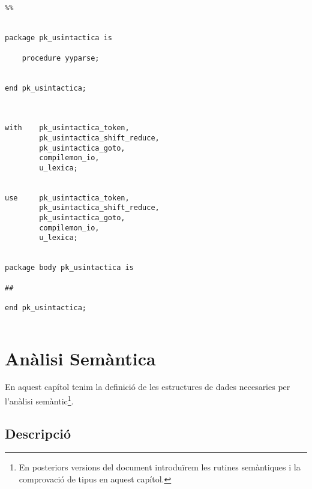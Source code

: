 \documentclass[10pt]{report}
\begin{document}
\begin{lstlisting}[style=Ada]
  
  
%%


package pk_usintactica is

    procedure yyparse;
    

end pk_usintactica;



with    pk_usintactica_token,
        pk_usintactica_shift_reduce,
        pk_usintactica_goto,
        compilemon_io,
        u_lexica;
        

use     pk_usintactica_token,
        pk_usintactica_shift_reduce,
        pk_usintactica_goto,
        compilemon_io,
        u_lexica;
        

package body pk_usintactica is

##

end pk_usintactica;
  

    \end{lstlisting}
    \newpage
    
    \chapter{Anàlisi Semàntica}
        En aquest capítol tenim la definició de les estructures de dades necesaries per l'anàlisi semàntic\footnote{En posteriors versions del document introduïrem les rutines semàntiques i la comprovació de tipus en aquest capítol.}.
        
    \section{Descripció}
\end{document}
